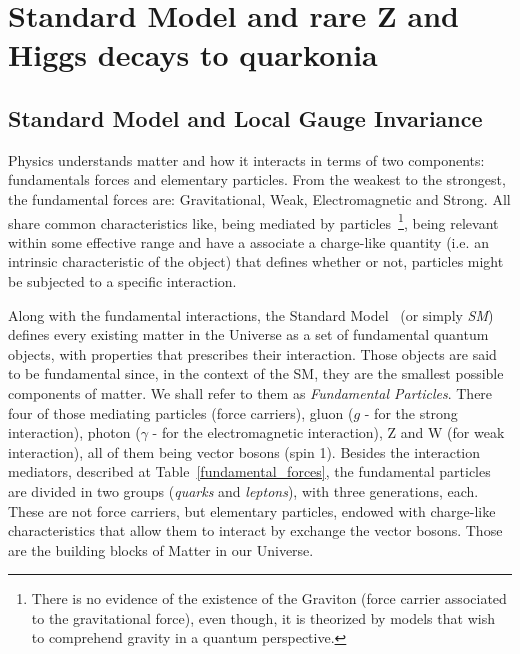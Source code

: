 \chapter{Standard Model and rare Z and Higgs decays to quarkonia}
\label{chaptertheory}

\section{Standard Model and Local Gauge Invariance}
\label{section_sm}

 
Physics understands matter and how it interacts in terms of two components: fundamentals forces and elementary particles. From the weakest to the strongest, the fundamental forces are: Gravitational, Weak, Electromagnetic and Strong. All share common characteristics like, being mediated by particles~\footnote{There is no evidence of the existence of the Graviton (force carrier associated to the gravitational force), even though, it is theorized by models that wish to comprehend gravity in a quantum perspective.}, being relevant within some effective range and have a associate a charge-like quantity (i.e. an intrinsic characteristic of the object) that defines whether or not, particles might be subjected to a specific interaction.

Along with the fundamental interactions, the Standard Model~\cite{burgess_moore_2006, oguri_qcd, Halzen:1984mc, Aitchison:2004cs} (or simply \textit{SM}) defines every existing matter in the Universe as a set of fundamental quantum objects, with properties that prescribes their interaction. Those objects are said to be fundamental since, in the context of the SM, they are the smallest possible components of matter. We shall refer to them as \textit{Fundamental Particles}. There four of those mediating particles (force carriers), gluon ($g$ - for the strong interaction), photon ($\gamma$ - for the electromagnetic interaction), Z and W (for weak interaction), all of them being vector bosons (spin 1). Besides the interaction mediators, described at Table~\ref{fundamental_forces}, the fundamental particles are divided in two groups (\textit{quarks} and \textit{leptons}), with three generations, each. These are not force carriers, but elementary particles, endowed with charge-like characteristics that allow them to interact by exchange the vector bosons. Those are the building blocks of Matter in our Universe.

